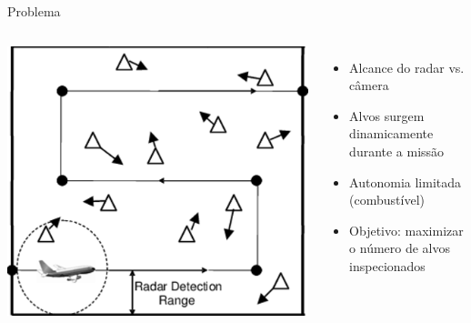 \documentclass[10pt]{beamer}
\begin{document}
\begin{frame}{Problema}
    \begin{columns}
        \centering
        \includegraphics[width=\linewidth]{fig/vant.png}
        \centering
        \begin{itemize}
            \item Alcance do radar vs. câmera
            \item Alvos surgem dinamicamente durante a missão
            \item Autonomia limitada (combustível)
            \item Objetivo: maximizar o número de alvos inspecionados
        \end{itemize}
    \end{columns}
\end{frame}
\end{document}

